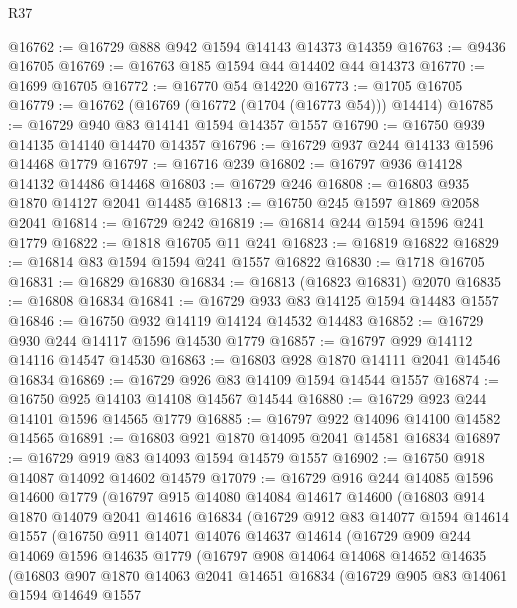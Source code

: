 \begin{lexlean}{R37}
\begin{coremodule}
@16762 := @16729 @888 @942 @1594 @14143 @14373 @14359
@16763 := @9436 @16705
@16769 := @16763 @185 @1594 @44 @14402 @44 @14373
@16770 := @1699 @16705
@16772 := @16770 @54 @14220
@16773 := @1705 @16705
@16779 := @16762 (@16769 (@16772 (@1704 (@16773 @54))) @14414)
@16785 := @16729 @940 @83 @14141 @1594 @14357 @1557
@16790 := @16750 @939 @14135 @14140 @14470 @14357
@16796 := @16729 @937 @244 @14133 @1596 @14468 @1779
@16797 := @16716 @239
@16802 := @16797 @936 @14128 @14132 @14486 @14468
@16803 := @16729 @246
@16808 := @16803 @935 @1870 @14127 @2041 @14485
@16813 := @16750 @245 @1597 @1869 @2058 @2041
@16814 := @16729 @242
@16819 := @16814 @244 @1594 @1596 @241 @1779
@16822 := @1818 @16705 @11 @241
@16823 := @16819 @16822
@16829 := @16814 @83 @1594 @1594 @241 @1557 @16822
@16830 := @1718 @16705
@16831 := @16829 @16830
@16834 := @16813 (@16823 @16831) @2070
@16835 := @16808 @16834
@16841 := @16729 @933 @83 @14125 @1594 @14483 @1557
@16846 := @16750 @932 @14119 @14124 @14532 @14483
@16852 := @16729 @930 @244 @14117 @1596 @14530 @1779
@16857 := @16797 @929 @14112 @14116 @14547 @14530
@16863 := @16803 @928 @1870 @14111 @2041 @14546 @16834
@16869 := @16729 @926 @83 @14109 @1594 @14544 @1557
@16874 := @16750 @925 @14103 @14108 @14567 @14544
@16880 := @16729 @923 @244 @14101 @1596 @14565 @1779
@16885 := @16797 @922 @14096 @14100 @14582 @14565
@16891 := @16803 @921 @1870 @14095 @2041 @14581 @16834
@16897 := @16729 @919 @83 @14093 @1594 @14579 @1557
@16902 := @16750 @918 @14087 @14092 @14602 @14579
@17079 := @16729
    @916
    @244
    @14085
    @1596
    @14600
    @1779
    (@16797
      @915
      @14080
      @14084
      @14617
      @14600
      (@16803
        @914
        @1870
        @14079
        @2041
        @14616
        @16834
        (@16729
          @912
          @83
          @14077
          @1594
          @14614
          @1557
          (@16750
            @911
            @14071
            @14076
            @14637
            @14614
            (@16729
              @909
              @244
              @14069
              @1596
              @14635
              @1779
              (@16797
                @908
                @14064
                @14068
                @14652
                @14635
                (@16803
                  @907
                  @1870
                  @14063
                  @2041
                  @14651
                  @16834
                  (@16729
                    @905
                    @83
                    @14061
                    @1594
                    @14649
                    @1557

\end{coremodule}
\end{lexlean}
